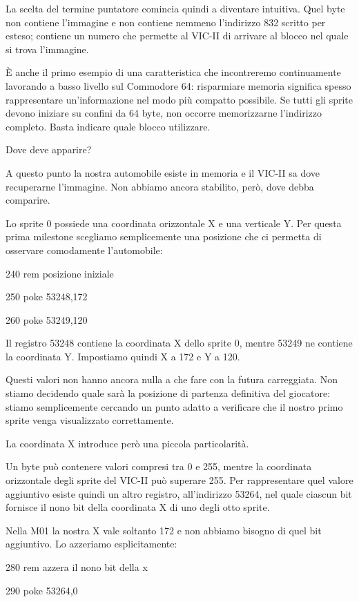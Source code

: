 \documentclass{article}
\begin{document}
La scelta del termine puntatore comincia quindi a diventare intuitiva. Quel byte non contiene l'immagine e non contiene
nemmeno l'indirizzo 832 scritto per esteso; contiene un numero che permette al VIC-II di arrivare al blocco nel quale
si trova l'immagine.

È anche il primo esempio di una caratteristica che incontreremo continuamente lavorando a basso livello sul Commodore
64: risparmiare memoria significa spesso rappresentare un'informazione nel modo più compatto possibile. Se tutti gli
sprite devono iniziare su confini da 64 byte, non occorre memorizzarne l'indirizzo completo. Basta indicare quale
blocco utilizzare.

Dove deve apparire?

A questo punto la nostra automobile esiste in memoria e il VIC-II sa dove recuperarne l'immagine. Non abbiamo ancora
stabilito, però, dove debba comparire.

Lo sprite 0 possiede una coordinata orizzontale X e una verticale Y. Per questa prima milestone scegliamo semplicemente
una posizione che ci permetta di osservare comodamente l'automobile:

240 rem posizione iniziale

250 poke 53248,172

260 poke 53249,120

Il registro 53248 contiene la coordinata X dello sprite 0, mentre 53249 ne contiene la coordinata Y. Impostiamo quindi X
a 172 e Y a 120.

Questi valori non hanno ancora nulla a che fare con la futura carreggiata. Non stiamo decidendo quale sarà la posizione
di partenza definitiva del giocatore: stiamo semplicemente cercando un punto adatto a verificare che il nostro primo
sprite venga visualizzato correttamente.

La coordinata X introduce però una piccola particolarità.

Un byte può contenere valori compresi tra 0 e 255, mentre la coordinata orizzontale degli sprite del VIC-II può superare
255. Per rappresentare quel valore aggiuntivo esiste quindi un altro registro, all'indirizzo 53264, nel quale ciascun
bit fornisce il nono bit della coordinata X di uno degli otto sprite.

Nella M01 la nostra X vale soltanto 172 e non abbiamo bisogno di quel bit aggiuntivo. Lo azzeriamo esplicitamente:

280 rem azzera il nono bit della x

290 poke 53264,0
\end{document}
